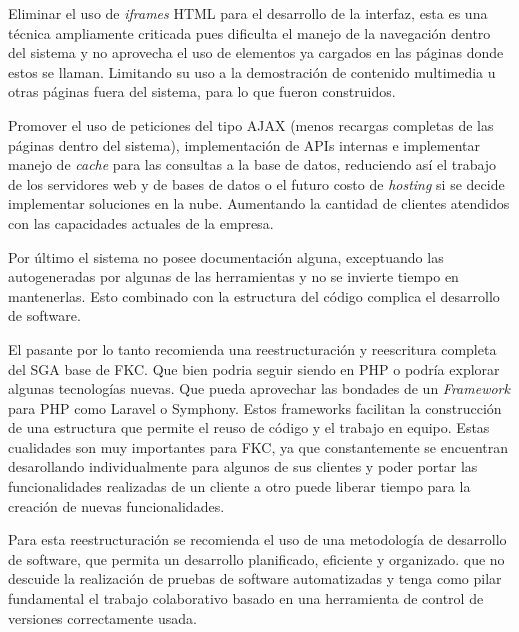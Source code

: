 Eliminar el uso de \emph{iframes} HTML para el desarrollo de la interfaz, esta es una técnica ampliamente criticada pues dificulta el manejo de la navegación dentro del sistema y no aprovecha el uso de elementos ya cargados en las páginas donde estos se llaman. Limitando su uso a la demostración de contenido multimedia u otras páginas fuera del sistema, para lo que fueron construidos.

Promover el uso de peticiones del tipo AJAX (menos recargas completas de las páginas dentro del sistema), implementación de APIs internas e implementar manejo de \emph{cache} para las consultas a la base de datos, reduciendo así el trabajo de los servidores web y de bases de datos o el futuro costo de \emph{hosting} si se decide implementar soluciones en la nube. Aumentando la cantidad de clientes atendidos con las capacidades actuales de la empresa.

Por último el sistema no posee documentación alguna, exceptuando las autogeneradas por algunas de las herramientas y no se invierte tiempo en mantenerlas. Esto combinado con la estructura del código complica el desarrollo de software.

El pasante por lo tanto recomienda una reestructuración y reescritura completa del SGA base de FKC. Que bien podria seguir siendo en PHP o podría explorar algunas tecnologías nuevas. Que pueda aprovechar las bondades de un \emph{Framework} para PHP como Laravel o Symphony. Estos frameworks facilitan la construcción de una estructura que permite el reuso de código y el trabajo en equipo. Estas cualidades son muy importantes para FKC, ya que constantemente se encuentran desarollando individualmente para algunos de sus clientes y poder portar las funcionalidades realizadas de un cliente a otro puede liberar tiempo para la creación de nuevas funcionalidades.

Para esta reestructuración se recomienda el uso de una metodología de desarrollo de software, que permita un desarrollo planificado, eficiente y organizado. que no descuide la realización de pruebas de software automatizadas y tenga como pilar fundamental el trabajo colaborativo basado en una herramienta de control de versiones correctamente usada.


